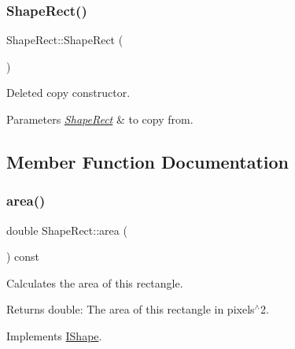 \subsubsection{\texorpdfstring{ShapeRect()}{ShapeRect()}\hspace{0.1cm}{\footnotesize\ttfamily [2/2]}}
{\footnotesize\ttfamily Shape\+Rect\+::\+Shape\+Rect (\begin{DoxyParamCaption}\item[{const \mbox{\hyperlink{class_shape_rect}{Shape\+Rect}} \&}]{ }\end{DoxyParamCaption})\hspace{0.3cm}{\ttfamily [delete]}}



Deleted copy constructor. 


\begin{DoxyParams}{Parameters}
{\em \mbox{\hyperlink{class_shape_rect}{Shape\+Rect}}} & to copy from. \\
\hline
\end{DoxyParams}


\subsection{Member Function Documentation}
\mbox{\label{class_shape_rect_a87e891eaa6975fc73f4148427076812e}} 
\subsubsection{\texorpdfstring{area()}{area()}}
{\footnotesize\ttfamily double Shape\+Rect\+::area (\begin{DoxyParamCaption}{ }\end{DoxyParamCaption}) const\hspace{0.3cm}{\ttfamily [virtual]}}



Calculates the area of this rectangle. 

\begin{DoxyReturn}{Returns}
double\+: The area of this rectangle in pixels$^\wedge$2. 
\end{DoxyReturn}


Implements \mbox{\hyperlink{class_i_shape_aed742a160acdd13c9cfdeb16e605afea}{I\+Shape}}.

\mbox{\label{class_shape_rect_acc35ed70d85acd941b56cc505b9fae6c}} 
